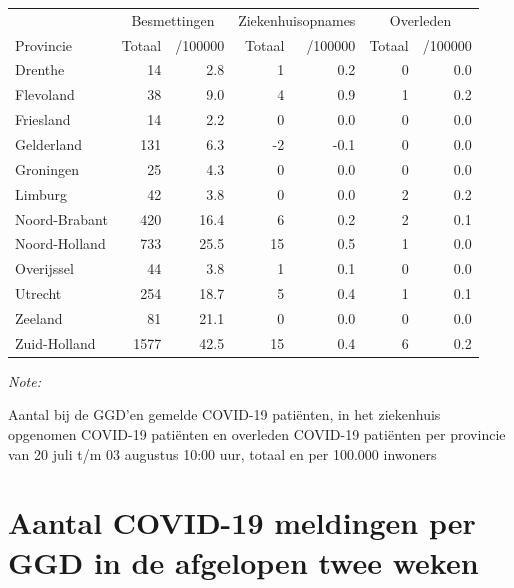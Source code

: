 \documentclass[
  english,
  man,floatsintext]{apa6}
\begin{document}
\begin{table}[H]
\centering
\begin{threeparttable}
\begin{tabular}{lrrrrrr}
\toprule
\multicolumn{1}{c}{ } & \multicolumn{2}{c}{Besmettingen} & \multicolumn{2}{c}{Ziekenhuisopnames} & \multicolumn{2}{c}{Overleden} \\
\cmidrule(l{3pt}r{3pt}){2-3} \cmidrule(l{3pt}r{3pt}){4-5} \cmidrule(l{3pt}r{3pt}){6-7}
Provincie & Totaal & /100000 & Totaal & /100000 & Totaal & /100000\\
\midrule
Drenthe & 14 & 2.8 & 1 & 0.2 & 0 & 0.0\\
Flevoland & 38 & 9.0 & 4 & 0.9 & 1 & 0.2\\
Friesland & 14 & 2.2 & 0 & 0.0 & 0 & 0.0\\
Gelderland & 131 & 6.3 & -2 & -0.1 & 0 & 0.0\\
Groningen & 25 & 4.3 & 0 & 0.0 & 0 & 0.0\\
Limburg & 42 & 3.8 & 0 & 0.0 & 2 & 0.2\\
Noord-Brabant & 420 & 16.4 & 6 & 0.2 & 2 & 0.1\\
Noord-Holland & 733 & 25.5 & 15 & 0.5 & 1 & 0.0\\
Overijssel & 44 & 3.8 & 1 & 0.1 & 0 & 0.0\\
Utrecht & 254 & 18.7 & 5 & 0.4 & 1 & 0.1\\
Zeeland & 81 & 21.1 & 0 & 0.0 & 0 & 0.0\\
Zuid-Holland & 1577 & 42.5 & 15 & 0.4 & 6 & 0.2\\
\bottomrule
\end{tabular}
\begin{tablenotes}
\item \textit{Note: } 
\item Aantal bij de GGD’en gemelde COVID-19 patiënten, in het ziekenhuis opgenomen COVID-19 patiënten en overleden COVID-19 patiënten per provincie van 20 juli t/m 03 augustus 10:00 uur, totaal en per 100.000 inwoners
\end{tablenotes}
\end{threeparttable}
\end{table}

\newpage

\hypertarget{aantal-covid-19-meldingen-per-ggd-in-de-afgelopen-twee-weken}{%
\section{Aantal COVID-19 meldingen per GGD in de afgelopen twee weken}\label{aantal-covid-19-meldingen-per-ggd-in-de-afgelopen-twee-weken}}
\end{document}
